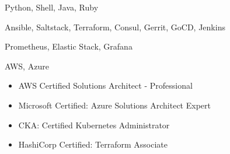 \documentclass{resume}
\begin{document}
\smallskip


\begin{body}
\begin{description}[style=nextline,leftmargin=8em,topsep=1pt]
	\item[语言] Python, Shell, Java, Ruby
	\item[工具] Ansible, Saltstack, Terraform, Consul, Gerrit, GoCD, Jenkins
	\item[监控] Prometheus, Elastic Stack, Grafana
	\item[云服务] AWS, Azure
\end{description}
\end{body}





%




\begin{body}
	\begin{itemize}[noitemsep,topsep=0pt]
		\item AWS Certified Solutions Architect - Professional
		\item Microsoft Certified: Azure Solutions Architect Expert
		\item CKA: Certified Kubernetes Administrator
		\item HashiCorp Certified: Terraform Associate
	\end{itemize}
\end{body}


\end{document}
